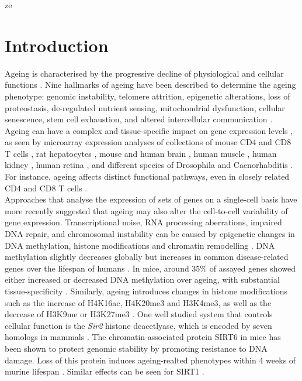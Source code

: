 ze

\section{Introduction}

Ageing is characterised by the progressive decline of physiological and cellular functions \citep{Lopez-Otin2013, Booth2016}. Nine hallmarks of ageing have been described to determine the ageing phenotype: genomic instability, telomere attrition, epigenetic alterations, loss of proteostasis, de-regulated nutrient sensing, mitochondrial dysfunction, cellular senescence, stem cell exhaustion, and altered intercellular communication \citep{Lopez-Otin2013}. Ageing can have a complex and tissue-specific impact on gene expression levels \citep{Zahn2007}, as seen by microarray expression analyses of collections of mouse CD4\plus{} and CD8\plus{} T cells \citep{Mirza2011}, rat hepatocytes \citep{Tollet-Egnell2000}, mouse and human brain \citep{Lu2004, Lee2000}, human muscle \citep{Welle2003, Zahn2006}, human kidney \citep{Rodwell2004}, human retina \citep{Yoshida2002}, and different species of Drosophila and Caenorhabditis \citep{Mccarroll2004}. For instance, ageing affects distinct functional pathways, even in closely related CD4\plus{} and CD8\plus{} T cells \citep{Mirza2011}. \\

Approaches that analyse the expression of sets of genes on a single-cell basis have more recently suggested that ageing may also alter the cell-to-cell variability of gene expression. Transcriptional noise, RNA processing aberrations, impaired DNA repair, and chromosomal instability can be caused by epigenetic changes in DNA methylation, histone modifications and chromatin remodelling \citep{Lopez-Otin2013}. DNA methylation slightly decreases globally but increases in common disease-related genes over the lifespan of humans \citep{Talens2012}. In mice, around 35\% of assayed genes showed either increased or decreased DNA methylation over ageing, with substantial tissue-specificity \citep{Maegawa2010}. Similarly, ageing introduces changes in histone modifications such as the increase of H4K16ac, H4K20me3 and H3K4me3, as well as the decrease of H3K9me or H3K27me3 \citep{Han2012, Fraga2007}. One well studied system that controls cellular function is the \emph{Sir2} histone deacetlyase, which is encoded by seven homologs in mammals \citep{Houtkooper2016}. The chromatin-associated protein SIRT6 in mice has been shown to protect genomic stability by promoting resistance to DNA damage. Loss of this protein induces ageing-realted phenotypes within 4 weeks of murine lifespan \cite{Mostoslavsky2006}. Similar effects can be seen for SIRT1 \cite{Oberdoerffer2008}.\\

